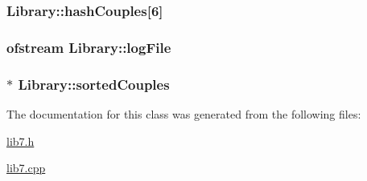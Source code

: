 \subsubsection[{\texorpdfstring{hash\+Couples}{hashCouples}}]{ Library\+::hash\+Couples\mbox{[}6\mbox{]}}\hypertarget{classLibrary_ac6f3af3c59edb37adb8d0becda498b42}{}\label{classLibrary_ac6f3af3c59edb37adb8d0becda498b42}
\subsubsection[{\texorpdfstring{log\+File}{logFile}}]{\setlength{\rightskip}{0pt plus 5cm}ofstream Library\+::log\+File}\hypertarget{classLibrary_ad8fbb4e17a98e57b3cffe8257710045d}{}\label{classLibrary_ad8fbb4e17a98e57b3cffe8257710045d}
\subsubsection[{\texorpdfstring{sorted\+Couples}{sortedCouples}}]{$\ast$ Library\+::sorted\+Couples}\hypertarget{classLibrary_a30e860e047d63ab63b40ac42e9660f25}{}\label{classLibrary_a30e860e047d63ab63b40ac42e9660f25}


The documentation for this class was generated from the following files\+:\begin{DoxyCompactItemize}
\item 
\hyperlink{lib7_8h}{lib7.\+h}\item 
\hyperlink{lib7_8cpp}{lib7.\+cpp}\end{DoxyCompactItemize}
